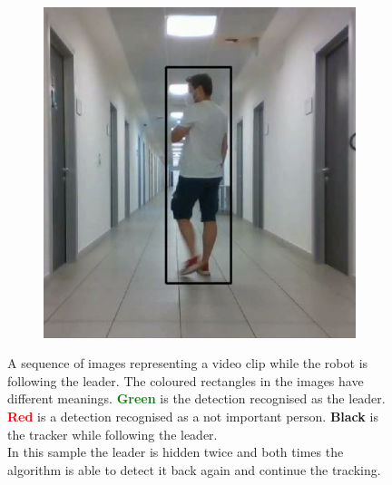 \begin{figure}[!h]
\begin{subfigure}[!h]{0.325\textwidth}
	\end{subfigure}
	\begin{subfigure}[!h]{0.325\textwidth}
		\includegraphics[width=\linewidth]{images/solution/sequenceTrackOk11}
	\end{subfigure}
	\captionsetup{margin=0.5cm}
	\caption[A video clip frames sequence of the tracking.]{A sequence of images representing a video clip while the robot is following the leader. The coloured rectangles in the images have different meanings. \textbf{\textcolor{green}{Green}} is the detection recognised as the leader. \textbf{\textcolor{red}{Red}} is a detection recognised as a not important person. \textbf{Black} is the tracker while following the leader.\\
		In this sample the leader is hidden twice and both times the algorithm is able to detect it back again and continue the tracking.}
	\label{fig:sequenceTracking}
\end{figure}


